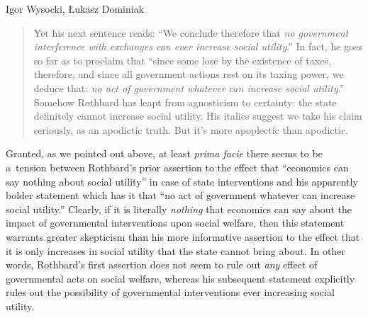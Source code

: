 \begin{artengenv}{Igor Wysocki, Łukasz Dominiak}
\begin{quote}
Yet his next sentence reads: ``We conclude therefore that \textit{no government interference with exchanges can ever increase social utility}.'' In fact, he goes so far as to proclaim that ``since some lose by the existence of taxes, therefore, and since all government actions rest on its taxing power, we deduce that: \textit{no act of government whatever can increase social utility}.'' Somehow Rothbard has leapt from agnosticism to certainty: the state definitely cannot increase social utility. His italics suggest we take his claim seriously, as an apodictic truth. But it's more apoplectic than apodictic.
\end{quote}



Granted, as we pointed out above, at least \textit{prima facie} there seems to be a~tension between Rothbard's prior assertion to the effect that ``economics can say nothing about social utility'' in case of state interventions and his apparently bolder statement which has it that ``no act of government whatever can increase social utility.'' Clearly, if it is literally \textit{nothing} that economics can say about the impact of governmental interventions upon social welfare, then this statement warrants greater skepticism than his more informative assertion to the effect that it is only increases in social utility that the state cannot bring about. In other words, Rothbard's first assertion does not seem to rule out \textit{any} effect of governmental acts on social welfare, whereas his subsequent statement explicitly rules out the possibility of governmental interventions ever increasing social utility.




\end{artengenv}
